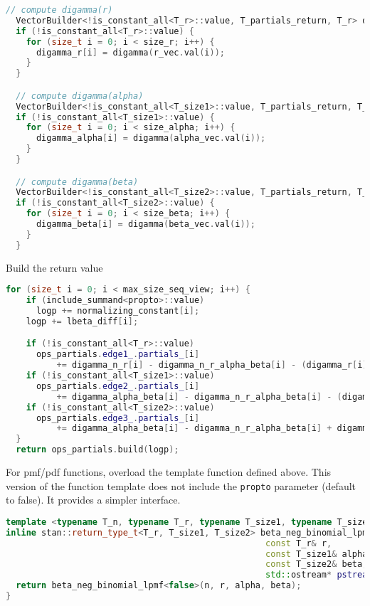 \documentclass[11pt]{article}
\begin{document}
\begin{lstlisting}[language=c++, style=lgeneral]
  // compute digamma(r)
  VectorBuilder<!is_constant_all<T_r>::value, T_partials_return, T_r> digamma_r(size_r);
  if (!is_constant_all<T_r>::value) {
    for (size_t i = 0; i < size_r; i++) {
      digamma_r[i] = digamma(r_vec.val(i));
    }
  }

  // compute digamma(alpha)
  VectorBuilder<!is_constant_all<T_size1>::value, T_partials_return, T_size1> digamma_alpha(size_alpha);
  if (!is_constant_all<T_size1>::value) {
    for (size_t i = 0; i < size_alpha; i++) {
      digamma_alpha[i] = digamma(alpha_vec.val(i));
    }
  }

  // compute digamma(beta)
  VectorBuilder<!is_constant_all<T_size2>::value, T_partials_return, T_size2> digamma_beta(size_beta);
  if (!is_constant_all<T_size2>::value) {
    for (size_t i = 0; i < size_beta; i++) {
      digamma_beta[i] = digamma(beta_vec.val(i));
    }
  }
\end{lstlisting}


Build the return value
\begin{lstlisting}[language=c++, style=lgeneral]
  for (size_t i = 0; i < max_size_seq_view; i++) {
    if (include_summand<propto>::value)
      logp += normalizing_constant[i];
    logp += lbeta_diff[i];

    if (!is_constant_all<T_r>::value)
      ops_partials.edge1_.partials_[i]
          += digamma_n_r[i] - digamma_n_r_alpha_beta[i] - (digamma_r[i] - digamma_r_alpha[i]);
    if (!is_constant_all<T_size1>::value)
      ops_partials.edge2_.partials_[i]
          += digamma_alpha_beta[i] - digamma_n_r_alpha_beta[i] - (digamma_alpha[i] - digamma_r_alpha[i]);
    if (!is_constant_all<T_size2>::value)
      ops_partials.edge3_.partials_[i]
          += digamma_alpha_beta[i] - digamma_n_r_alpha_beta[i] + digamma_n_beta[i] - digamma_beta[i];
  }
  return ops_partials.build(logp);
\end{lstlisting}


For pmf/pdf functions, overload the template function defined above. This version of the function template does not include the \verb|propto| parameter (default to false). It provides a simpler interface.

\begin{lstlisting}[language=c++, style=lgeneral]
template <typename T_n, typename T_r, typename T_size1, typename T_size2>
inline stan::return_type_t<T_r, T_size1, T_size2> beta_neg_binomial_lpmf(const T_n& n, 
                                                   const T_r& r,
                                                   const T_size1& alpha,
                                                   const T_size2& beta,
                                                   std::ostream* pstream__) {
  return beta_neg_binomial_lpmf<false>(n, r, alpha, beta);
}
\end{lstlisting}
\end{document}
